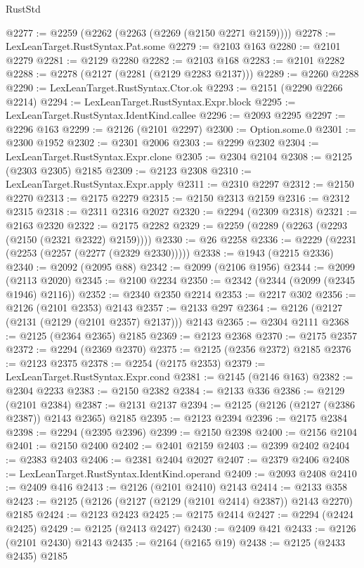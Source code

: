 \begin{lexlean}{RustStd}
\begin{coremodule}
@2277 := @2259 (@2262 (@2263 (@2269 (@2150 @2271 @2159))))
@2278 := LexLeanTarget.RustSyntax.Pat.some
@2279 := @2103 @163
@2280 := @2101 @2279
@2281 := @2129 @2280
@2282 := @2103 @168
@2283 := @2101 @2282
@2288 := @2278 (@2127 (@2281 (@2129 @2283 @2137)))
@2289 := @2260 @2288
@2290 := LexLeanTarget.RustSyntax.Ctor.ok
@2293 := @2151 (@2290 @2266 @2214)
@2294 := LexLeanTarget.RustSyntax.Expr.block
@2295 := LexLeanTarget.RustSyntax.IdentKind.callee
@2296 := @2093 @2295
@2297 := @2296 @163
@2299 := @2126 (@2101 @2297)
@2300 := Option.some.{0}
@2301 := @2300 @1952
@2302 := @2301 @2006
@2303 := @2299 @2302
@2304 := LexLeanTarget.RustSyntax.Expr.clone
@2305 := @2304 @2104
@2308 := @2125 (@2303 @2305) @2185
@2309 := @2123 @2308
@2310 := LexLeanTarget.RustSyntax.Expr.apply
@2311 := @2310 @2297
@2312 := @2150 @2270
@2313 := @2175 @2279
@2315 := @2150 @2313 @2159
@2316 := @2312 @2315
@2318 := @2311 @2316 @2027
@2320 := @2294 (@2309 @2318)
@2321 := @2163 @2320
@2322 := @2175 @2282
@2329 := @2259 (@2289 (@2263 (@2293 (@2150 (@2321 @2322) @2159))))
@2330 := @26 @2258
@2336 := @2229 (@2231 (@2253 (@2257 (@2277 (@2329 @2330)))))
@2338 := @1943 (@2215 @2336)
@2340 := @2092 (@2095 @88)
@2342 := @2099 (@2106 @1956)
@2344 := @2099 (@2113 @2020)
@2345 := @2100 @2234
@2350 := @2342 (@2344 (@2099 (@2345 @1946) @2116))
@2352 := @2340 @2350 @2214
@2353 := @2217 @302
@2356 := @2126 (@2101 @2353) @2143
@2357 := @2133 @297
@2364 := @2126 (@2127 (@2131 (@2129 (@2101 @2357) @2137))) @2143
@2365 := @2304 @2111
@2368 := @2125 (@2364 @2365) @2185
@2369 := @2123 @2368
@2370 := @2175 @2357
@2372 := @2294 (@2369 @2370)
@2375 := @2125 (@2356 @2372) @2185
@2376 := @2123 @2375
@2378 := @2254 (@2175 @2353)
@2379 := LexLeanTarget.RustSyntax.Expr.cond
@2381 := @2145 (@2146 @163)
@2382 := @2304 @2233
@2383 := @2150 @2382
@2384 := @2133 @336
@2386 := @2129 (@2101 @2384)
@2387 := @2131 @2137
@2394 := @2125 (@2126 (@2127 (@2386 @2387)) @2143 @2365) @2185
@2395 := @2123 @2394
@2396 := @2175 @2384
@2398 := @2294 (@2395 @2396)
@2399 := @2150 @2398
@2400 := @2156 @2104
@2401 := @2150 @2400
@2402 := @2401 @2159
@2403 := @2399 @2402
@2404 := @2383 @2403
@2406 := @2381 @2404 @2027
@2407 := @2379 @2406
@2408 := LexLeanTarget.RustSyntax.IdentKind.operand
@2409 := @2093 @2408
@2410 := @2409 @416
@2413 := @2126 (@2101 @2410) @2143
@2414 := @2133 @358
@2423 := @2125 (@2126 (@2127 (@2129 (@2101 @2414) @2387)) @2143 @2270) @2185
@2424 := @2123 @2423
@2425 := @2175 @2414
@2427 := @2294 (@2424 @2425)
@2429 := @2125 (@2413 @2427)
@2430 := @2409 @421
@2433 := @2126 (@2101 @2430) @2143
@2435 := @2164 (@2165 @19)
@2438 := @2125 (@2433 @2435) @2185

\end{coremodule}
\end{lexlean}
